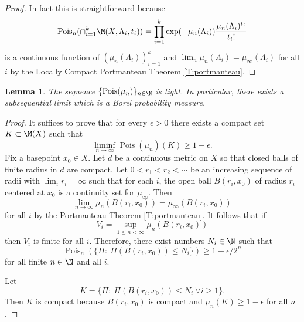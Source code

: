 \documentclass[12pt]{article}
\theoremstyle{plain}
\newtheorem{lem}[thm]{Lemma}
\theoremstyle{definition}
\theoremstyle{remark}
\newcommand{\eps}{\epsilon}
\newcommand\Pois{\operatorname{Pois}}
\begin{document}
\begin{proof}
In fact this is straightforward because
$$\Pois_n(\cap_{i=1}^k \M(X,\Lambda_i, t_i))= \prod_{i=1}^k \exp(-\mu_n(\Lambda_i)) \frac{\mu_n(\Lambda_i)^{t_i}}{t_i!}$$
is a continuous function of $(\mu_n(\Lambda_i))_{i=1}^k$ and $\lim_n \mu_n(\Lambda_i)=\mu_\infty(\Lambda_i)$ for all $i$ by the Locally Compact Portmanteau Theorem \ref{T:portmanteau}.
\end{proof}

\begin{lem}\label{L:tight}
 The sequence $\{\Pois(\mu_n)\}_{n \in \N}$ is tight. In particular, there exists a subsequential limit which is a Borel probability measure.
\end{lem}

\begin{proof}
It suffices to prove that for every $\eps>0$ there exists a compact set $K \subset \M(X)$ such that
$$\liminf_{n\to\infty} \Pois(\mu_n)(K) \ge 1-\eps.$$
Fix a basepoint $x_0\in X$. Let $d$ be a continuous metric on $X$ so that closed balls of finite radius in $d$ are compact. Let $0<r_1<r_2<\cdots$ be an increasing sequence of radii with $\lim_i r_i=\infty$ such that for each $i$, the open ball $B(r_i,x_0)$ of radius $r_i$ centered at $x_0$ is a continuity set for $\mu_\infty$. Then
$$\lim_{n\to\infty} \mu_n(B(r_i,x_0)) = \mu_\infty(B(r_i,x_0))$$
for all $i$ by the Portmanteau Theorem \ref{T:portmanteau}. It follows that if
$$V_i = \sup_{1\le n < \infty} \mu_n(B(r_i,x_0))$$
then $V_i$ is finite for all $i$. Therefore, there exist numbers $N_i\in \N$ such that 
$$\Pois_n(\{\Pi:~ \Pi(B(r_i,x_0)) \le N_i\}) \ge 1-\eps/2^n$$
for all finite $n \in \N$ and all $i$. 

Let
$$K = \{\Pi:~ \Pi(B(r_i,x_0)) \le N_i~\forall i \ge 1\}.$$
Then $K$ is compact because $B(r_i,x_0)$ is compact and $\mu_n(K) \ge 1-\eps$ for all $n$. 
\end{proof}
\end{document}
